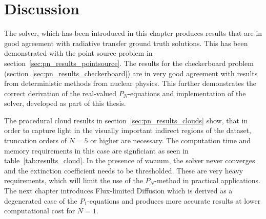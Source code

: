 \section{Discussion}

The solver, which has been introduced in this chapter produces results that are in good agreement with radiative transfer ground truth solutions. This has been demonstrated with the point source problem in section~\ref{sec:pn_results_pointsource}. The results for the checkerboard problem (section~\ref{sec:pn_results_checkerboard}) are in very good agreement with results from deterministic methods from nuclear physics. This further demonstrates the correct derivation of the real-valued $P_N$-equations and implementation of the solver, developed as part of this thesis.

The procedural cloud results in section~\ref{sec:pn_results_clouds} show, that in order to capture light in the visually important indirect regions of the dataset, truncation orders of $N=5$ or higher are necessary. The computation time and memory requirements in this case are signficiant as seen in table~\ref{tab:results_cloud}. In the presence of vacuum, the solver never converges and the extinction coefficient needs to be thresholded. These are very heavy requirements, which will limit the use of the $P_N$-method in practical applications. The next chapter introduces Flux-limited Diffusion which is derived as a degenerated case of the $P_1$-equations and produces more accurate results at lower computational cost for $N=1$.
